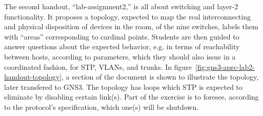 The second handout, ``lab-assignment2,'' is all about switching and layer-2 functionality.
It proposes a topology, expected to map the real interconnecting and physical disposition of devices in the room, of the nine switches, labels them with ``areas'' corresponding to cardinal points.
Students are then guided to answer questions about the expected behavior, e.g. in terms of reachability between hosts, according to parameters, which they should also issue in a coordinated fashion, for STP, VLANs, and trunks.
In figure~\ref{fig:gns3-aprc-lab2-handout-topology}, a section of the document is shown to illustrate the topology, later transfered to GNS3.
The topology has loops which STP is expected to eliminate by disabling certain link(s).
Part of the exercise is to foresee, according to the protocol's specification, which one(s) will be shutdown.



